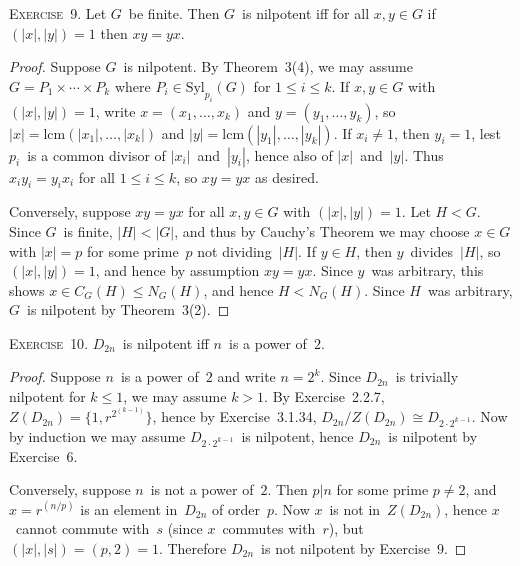 \documentclass[letterpaper]{article}
\newcommand{\exercise}[1]{\goodbreak\noindent\textsc{Exercise~{#1}.}}
\newcommand{\iso}{\cong}
\newcommand{\subgroup}{\le}
\newcommand{\syl}{\mathrm{Syl}}
\newcommand{\lcmsingle}[1]{\mathrm{lcm}({#1})}
\newcommand{\ord}[1]{|{#1}|}
\begin{document}
\exercise{9}
Let $G$~be finite. Then $G$~is nilpotent iff for all $x,y\in G$ if $(\ord{x},\ord{y})=1$ then $xy=yx$.
\begin{proof}
Suppose $G$~is nilpotent. By Theorem~3(4), we may assume $G=P_1\times\cdots\times P_k$ where $P_i\in\syl_{p_i}(G)$ for $1\le i\le k$. If $x,y\in G$ with $(\ord{x},\ord{y})=1$, write $x=(x_1,\ldots,x_k)$ and $y=(y_1,\ldots,y_k)$, so $\ord{x}=\lcmsingle{\ord{x_1},\ldots,\ord{x_k}}$ and $\ord{y}=\lcmsingle{\ord{y_1},\ldots,\ord{y_k}}$. If $x_i\ne1$, then $y_i=1$, lest $p_i$~is a common divisor of $\ord{x_i}$~and~$\ord{y_i}$, hence also of $\ord{x}$~and~$\ord{y}$. Thus $x_iy_i=y_ix_i$ for all $1\le i\le k$, so $xy=yx$ as desired.

Conversely, suppose $xy=yx$ for all $x,y\in G$ with $(\ord{x},\ord{y})=1$. Let $H<G$. Since $G$~is finite, $\ord{H}<\ord{G}$, and thus by Cauchy's Theorem we may choose $x\in G$ with $\ord{x}=p$ for some prime~$p$ not dividing~$\ord{H}$. If $y\in H$, then $y$~divides~$\ord{H}$, so $(\ord{x},\ord{y})=1$, and hence by assumption $xy=yx$. Since $y$~was arbitrary, this shows $x\in C_G(H)\subgroup N_G(H)$, and hence $H<N_G(H)$. Since $H$~was arbitrary, $G$~is nilpotent by Theorem~3(2).
\end{proof}

\exercise{10} $D_{2n}$~is nilpotent iff $n$~is a power of~$2$.
\begin{proof}
Suppose $n$~is a power of~$2$ and write $n=2^k$. Since $D_{2n}$~is trivially nilpotent for $k\le1$, we may assume $k>1$. By Exercise~2.2.7, $Z(D_{2n})=\{1,r^{2^{(k-1)}}\}$, hence by Exercise~3.1.34, $D_{2n}/Z(D_{2n})\iso D_{2\cdot 2^{k-1}}$. Now by induction we may assume $D_{2\cdot 2^{k-1}}$~is nilpotent, hence $D_{2n}$~is nilpotent by Exercise~6.

Conversely, suppose $n$~is not a power of~$2$. Then $p|n$ for some prime $p\ne2$, and $x=r^{(n/p)}$ is an element in~$D_{2n}$ of order~$p$. Now $x$~is not in~$Z(D_{2n})$, hence $x$~cannot commute with~$s$ (since $x$~commutes with~$r$), but $(\ord{x},\ord{s})=(p,2)=1$. Therefore $D_{2n}$~is not nilpotent by Exercise~9.
\end{proof}
\end{document}
